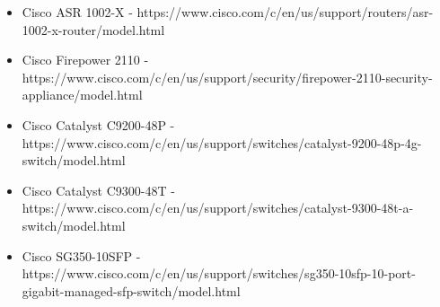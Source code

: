 \documentclass[12pt,a4paper]{article}
\begin{document}
	\begin{itemize}
		\item Cisco ASR 1002-X - https://www.cisco.com/c/en/us/support/routers/asr-1002-x-router/model.html
		\item Cisco Firepower 2110 - https://www.cisco.com/c/en/us/support/security/firepower-2110-security-appliance/model.html
		\item Cisco Catalyst C9200-48P - https://www.cisco.com/c/en/us/support/switches/catalyst-9200-48p-4g-switch/model.html
		\item Cisco Catalyst C9300-48T - https://www.cisco.com/c/en/us/support/switches/catalyst-9300-48t-a-switch/model.html
		\item Cisco SG350-10SFP - https://www.cisco.com/c/en/us/support/switches/sg350-10sfp-10-port-gigabit-managed-sfp-switch/model.html
	\end{itemize}
	
\end{document}

